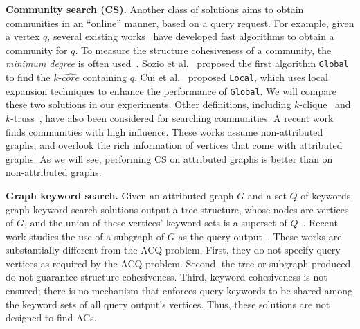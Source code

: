 \textbf{Community search (CS).}  Another class of solutions aims to obtain communities in an ``online'' manner, based on a query request. For example, given a vertex $q$, several existing works~\cite{KDD2010,local2014,vldb2015,online-sigmod2013,k-truss2014} have developed fast algorithms to obtain a community for $q$.
To measure the structure cohesiveness of a community, the {\it minimum degree} is often used~\cite{KDD2010,local2014,vldb2015}. Sozio et al.~\cite{KDD2010} proposed the first algorithm {\tt Global} to find the $k$-$\widehat{core}$ containing $q$.
Cui et al.~\cite{local2014} proposed {\tt Local}, which uses local expansion techniques to enhance the performance of {\tt Global}. We will compare these two solutions in our experiments.
Other definitions, including $k$-clique~\cite{online-sigmod2013} and $k$-truss~\cite{k-truss2014}, have also been considered for searching communities. A recent work~\cite{vldb2015} finds communities with high influence.  These works assume non-attributed graphs, and overlook the rich information of vertices that come with attributed graphs. As we will see, performing CS on attributed graphs is better than on non-attributed graphs.

\textbf{Graph keyword search.}  Given an attributed graph $G$ and a set $Q$ of keywords, graph keyword search solutions output a tree structure, whose nodes are vertices of $G$, and the union of these vertices' keyword sets is a superset of $Q$~\cite{keyword-icde2002,keyword-icde2007,keyword-vldb2005}. Recent work studies the use of a subgraph of $G$ as the query output~\cite{keyword-vldb2011}. These works are substantially different from the ACQ problem. First, they do not specify query vertices as required by the ACQ problem. Second, the tree or subgraph produced do not guarantee structure cohesiveness. Third, keyword cohesiveness is not ensured; there is no mechanism that enforces query keywords to be shared among the keyword sets of all query output's vertices. Thus, these solutions are not designed to find ACs.


